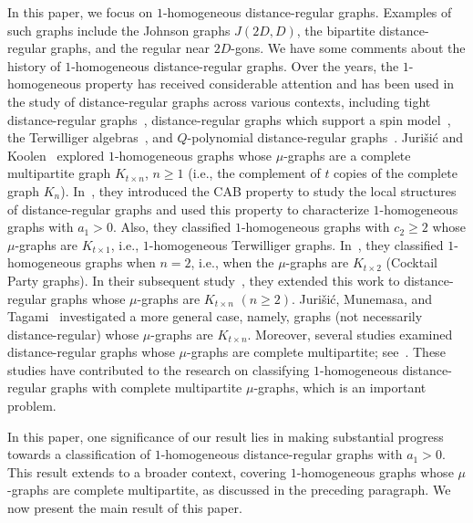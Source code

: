 \documentclass[11pt]{article}
\theoremstyle{definition}
\numberwithin{equation}{section}
\numberwithin{equation}{section}
\begin{document}
In this paper, we focus on $1$-homogeneous distance-regular graphs.
Examples of such graphs include the Johnson graphs $J(2D, D)$, the bipartite distance-regular graphs, and the regular near $2D$-gons. 
We have some comments about the history of $1$-homogeneous distance-regular graphs.
Over the years, the $1$-homogeneous property has received considerable attention and has been used in the study of distance-regular graphs across various contexts, including tight distance-regular graphs~\cite{JKT2000, KLLLLT2023+}, distance-regular graphs which support a spin model~\cite{CurtinNomura2004}, the Terwilliger algebras~\cite{CurtinNomura2005}, and $Q$-polynomial distance-regular graphs~\cite{Miklavic2004}.
Juri\v{s}i\'{c} and Koolen~\cite{JK2000-1, JK2003, JK2011} explored $1$-homogeneous graphs whose $\mu$-graphs are a complete multipartite graph $K_{t\times n}$, $n\geqslant 1$ (i.e., the complement of $t$ copies of the complete graph $K_n$).
In~\cite{JK2000-1}, they introduced the CAB property to study the local structures of distance-regular graphs and used this property to characterize $1$-homogeneous graphs with $a_1 > 0$. 
Also, they classified $1$-homogeneous graphs with $c_2\geqslant 2$ whose $\mu$-graphs are $K_{t\times 1}$, i.e., $1$-homogeneous Terwilliger graphs.
In~\cite{JK2003}, they classified $1$-homogeneous graphs when $n=2$, i.e., when the $\mu$-graphs are $K_{t\times 2}$ (Cocktail Party graphs).
In their subsequent study~\cite{JK2007}, they extended this work to distance-regular graphs whose $\mu$-graphs are $K_{t\times n}$ $(n\geqslant 2)$.
Juri\v{s}i\'{c}, Munemasa, and Tagami~\cite{JMT2010} investigated a more general case, namely, graphs (not necessarily distance-regular) whose $\mu$-graphs are $K_{t\times n}$.
Moreover, several studies examined distance-regular graphs whose $\mu$-graphs are complete multipartite; see~\cite{JK2000-2,JK2011, KLLLLT2023+}.
These studies have contributed to the research on classifying $1$-homogeneous distance-regular graphs with complete multipartite $\mu$-graphs, which is an important problem.

In this paper, one significance of our result lies in making substantial progress towards a classification of $1$-homogeneous distance-regular graphs with $a_1 > 0$. 
This result extends to a broader context, covering $1$-homogeneous graphs whose $\mu$-graphs are complete multipartite, as discussed in the preceding paragraph.
We now present the main result of this paper.
\end{document}
